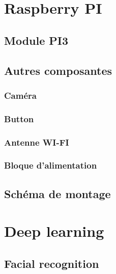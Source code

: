 {%

\pagebreak
{}

\chapter{Raspberry PI}\thispagestyle{fancy} %

\section{Module PI3}

\section{Autres composantes}
    \subsection{Caméra}
    \subsection{Button}
    \subsection{Antenne WI-FI}
    \subsection{Bloque d'alimentation}

\section{Schéma de montage}
    


\pagebreak
{}

\chapter{Deep learning}\thispagestyle{fancy}
\section{Facial recognition}
}
